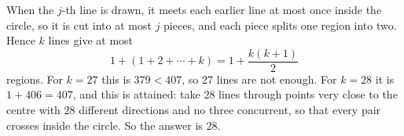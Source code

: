 When the $j$-th line is drawn, it meets each earlier line at most once inside the circle, so it is cut into at most $j$ pieces, and each piece splits one region into two. Hence $k$ lines give at most
\[1+(1+2+\cdots+k)=1+\dfrac{k(k+1)}{2}\]
regions. For $k=27$ this is $379<407$, so $27$ lines are not enough. For $k=28$ it is $1+406=407$, and this is attained: take $28$ lines through points very close to the centre with $28$ different directions and no three concurrent, so that every pair crosses inside the circle. So the answer is $\boxed{28}$.
